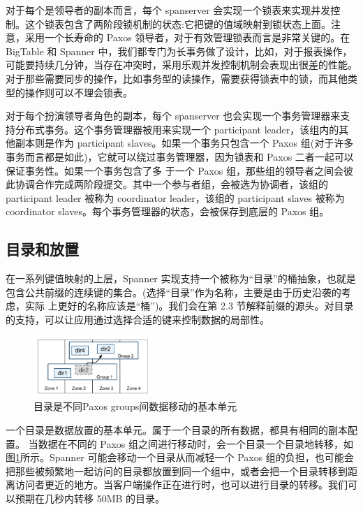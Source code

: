 \documentclass[letterpaper,twocolumn,10pt]{article}
\begin{document}
对于每个是领导者的副本而言，每个 spanserver 会实现一个锁表来实现并发控制。这个锁表包含了两阶段锁机制的状态:它把键的值域映射到锁状态上面。注意，采用一个长寿命的 Paxos 领导者，对于有效管理锁表而言是非常关键的。在 BigTable 和 Spanner 中，我们都专门为长事务做了设计，比如，对于报表操作，可能要持续几分钟，当存在冲突时，采用乐观并发控制机制会表现出很差的性能。对于那些需要同步的操作，比如事务型的读操作，需要获得锁表中的锁，而其他类型的操作则可以不理会锁表。

对于每个扮演领导者角色的副本，每个 spanserver 也会实现一个事务管理器来支持分布式事务。这个事务管理器被用来实现一个 participant leader，该组内的其他副本则是作为 participant slaves。如果一个事务只包含一个 Paxos 组(对于许多事务而言都是如此)，它就可以绕过事务管理器，因为锁表和 Paxos 二者一起可以保证事务性。如果一个事务包含了多 于一个 Paxos 组，那些组的领导者之间会彼此协调合作完成两阶段提交。其中一个参与者组，会被选为协调者，该组的 participant leader 被称为 coordinator leader，该组的 participant slaves 被称为 coordinator slaves。每个事务管理器的状态，会被保存到底层的 Paxos 组。

\subsection{目录和放置}

在一系列键值映射的上层，Spanner 实现支持一个被称为“目录”的桶抽象，也就是包含公共前缀的连续键的集合。(选择“目录”作为名称，主要是由于历史沿袭的考虑，实际 上更好的名称应该是“桶”)。我们会在第 2.3 节解释前缀的源头。对目录的支持，可以让应用通过选择合适的键来控制数据的局部性。

\begin{figure}[htbp]
\begin{center}
\includegraphics[width=0.4\textwidth]{./fig_3.png}
\caption{目录是不同Paxos groups间数据移动的基本单元}
\label{Fig3}
\end{center}
\end{figure}

一个目录是数据放置的基本单元。属于一个目录的所有数据，都具有相同的副本配置。 当数据在不同的 Paxos 组之间进行移动时，会一个目录一个目录地转移，如图\ref{Fig3}所示。Spanner 可能会移动一个目录从而减轻一个 Paxos 组的负担，也可能会把那些被频繁地一起访问的目录都放置到同一个组中，或者会把一个目录转移到距离访问者更近的地方。当客户端操作正在进行时，也可以进行目录的转移。我们可以预期在几秒内转移 50MB 的目录。
\end{document}
